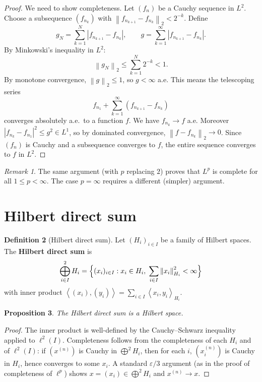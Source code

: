 \documentclass[a4paper,12pt]{book}
\newcommand{\norm}[1]{\left\| #1 \right\|}
\newcommand{\abs}[1]{\left| #1 \right|}
\newcommand{\inner}[2]{\left\langle #1, #2 \right\rangle}
\theoremstyle{definition}
\newtheorem{definition}{Definition}[chapter]
\theoremstyle{plain}
\newtheorem{proposition}[definition]{Proposition}
\theoremstyle{remark}
\newtheorem{remark}[definition]{Remark}
\begin{document}
\begin{proof}
We need to show completeness.  Let $(f_n)$ be a Cauchy sequence in $L^2$.
Choose a subsequence $(f_{n_k})$ with
$\norm{f_{n_{k+1}}-f_{n_k}}_2 < 2^{-k}$.  Define
\[
  g_N = \sum_{k=1}^N \abs{f_{n_{k+1}}-f_{n_k}},\qquad
  g = \sum_{k=1}^{\infty}\abs{f_{n_{k+1}}-f_{n_k}}.
\]
By Minkowski's inequality in $L^2$:
\[
  \norm{g_N}_2 \le \sum_{k=1}^N 2^{-k} < 1.
\]
By monotone convergence,
$\norm{g}_2\le 1$, so $g<\infty$ a.e.  This means the telescoping series
\[
  f_{n_1} + \sum_{k=1}^{\infty}(f_{n_{k+1}}-f_{n_k})
\]
converges absolutely a.e.\ to a function $f$.  We have $f_{n_k}\to f$
a.e.  Moreover
$\abs{f_{n_k}-f_{n_1}}^2\le g^2\in L^1$, so by dominated
convergence,
$\norm{f-f_{n_k}}_2\to 0$.  Since $(f_n)$ is Cauchy and a subsequence
converges to $f$, the entire sequence converges to $f$ in $L^2$.
\end{proof}

\begin{remark}
The same argument (with $p$ replacing $2$) proves that $L^p$ is complete
for all $1\le p<\infty$.  The case $p=\infty$ requires a different (simpler)
argument.
\end{remark}

\section{Hilbert direct sum}
\label{sec:hilbert-sum}

\begin{definition}[Hilbert direct sum]
\label{def:hilbert-sum}
Let $(H_i)_{i\in I}$ be a family of Hilbert spaces.  The
\textbf{Hilbert direct sum} is
\[
  \bigoplus_{i\in I}^{2} H_i
  = \Bigl\{ (x_i)_{i\in I} : x_i\in H_i,\;
    \sum_{i\in I}\norm{x_i}_{H_i}^2 < \infty \Bigr\}
\]
with inner product $\inner{(x_i)}{(y_i)} = \sum_{i\in I}\inner{x_i}{y_i}_{H_i}$.
\end{definition}

\begin{proposition}
\label{prop:hilbert-sum-complete}
The Hilbert direct sum is a Hilbert space.
\end{proposition}

\begin{proof}
The inner product is well-defined by the Cauchy--Schwarz inequality
applied to $\ell^2(I)$.  Completeness follows from the completeness of
each $H_i$ and of $\ell^2(I)$: if $(x^{(n)})$ is Cauchy in
$\bigoplus^2 H_i$, then for each $i$, $(x_i^{(n)})$ is Cauchy in $H_i$,
hence converges to some $x_i$.  A standard $\varepsilon/3$ argument (as
in the proof of completeness of $\ell^p$) shows
$x=(x_i)\in\bigoplus^2 H_i$ and $x^{(n)}\to x$.
\end{proof}
\end{document}
